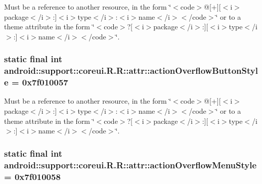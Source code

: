Must be a reference to another resource, in the form \char`\"{}$<$code$>$@\mbox{[}+\mbox{]}\mbox{[}$<$i$>$package$<$/i$>$:\mbox{]}$<$i$>$type$<$/i$>$:$<$i$>$name$<$/i$>$$<$/code$>$\char`\"{} or to a theme attribute in the form \char`\"{}$<$code$>$?\mbox{[}$<$i$>$package$<$/i$>$:\mbox{]}\mbox{[}$<$i$>$type$<$/i$>$:\mbox{]}$<$i$>$name$<$/i$>$$<$/code$>$\char`\"{}. \hypertarget{classandroid_1_1support_1_1coreui_1_1_r_1_1attr_8a210f2a2f8a5303c3fb09e989c19f47}{
\subsubsection[{actionOverflowButtonStyle}]{\setlength{\rightskip}{0pt plus 5cm}static final int android::support::coreui.R.R::attr::actionOverflowButtonStyle = 0x7f010057}}
\label{classandroid_1_1support_1_1coreui_1_1_r_1_1attr_8a210f2a2f8a5303c3fb09e989c19f47}


Must be a reference to another resource, in the form \char`\"{}$<$code$>$@\mbox{[}+\mbox{]}\mbox{[}$<$i$>$package$<$/i$>$:\mbox{]}$<$i$>$type$<$/i$>$:$<$i$>$name$<$/i$>$$<$/code$>$\char`\"{} or to a theme attribute in the form \char`\"{}$<$code$>$?\mbox{[}$<$i$>$package$<$/i$>$:\mbox{]}\mbox{[}$<$i$>$type$<$/i$>$:\mbox{]}$<$i$>$name$<$/i$>$$<$/code$>$\char`\"{}. \hypertarget{classandroid_1_1support_1_1coreui_1_1_r_1_1attr_cbb51f4f1d6737266fa3f53f713a0b41}{
\subsubsection[{actionOverflowMenuStyle}]{\setlength{\rightskip}{0pt plus 5cm}static final int android::support::coreui.R.R::attr::actionOverflowMenuStyle = 0x7f010058}}
\label{classandroid_1_1support_1_1coreui_1_1_r_1_1attr_cbb51f4f1d6737266fa3f53f713a0b41}


